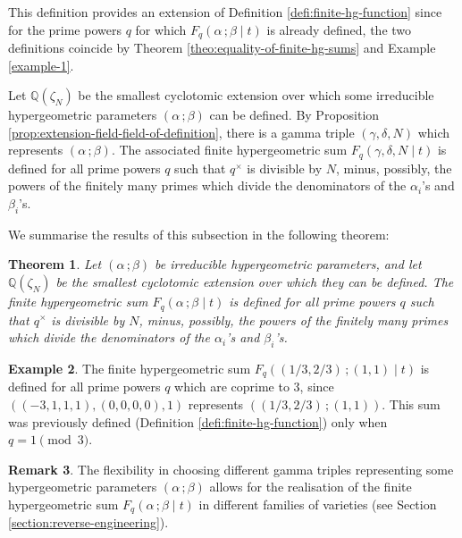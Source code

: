 \documentclass[11pt, reqno]{amsart}
\theoremstyle{plain}
\newtheorem{theo}{Theorem}[section]
\theoremstyle{definition}
\newtheorem{rem}[theo]{Remark}
\newtheorem{exa}[theo]{Example}
\newcommand{\Q}{\mathbb{Q}}
\newcommand{\ga}{\gamma}
\newcommand{\be}{\beta}
\newcommand{\al}{\alpha}
\begin{document}
This definition provides an extension of Definition \ref{defi:finite-hg-function} since for the prime powers $q$ for which $F_q(\al \, ; \be \mid t)$ is already defined, the two definitions coincide by Theorem \ref{theo:equality-of-finite-hg-sums} and Example \ref{example-1}.

Let $\Q(\zeta_N)$ be the smallest cyclotomic extension over which some irreducible hypergeometric parameters $(\al \,; \be)$ can be defined. By Proposition \ref{prop:extension-field-field-of-definition}, there is a gamma triple $(\ga,\delta,N)$ which represents $(\al \, ; \be)$. 
The associated finite hypergeometric sum $F_q(\ga,\delta,N \mid t)$ is defined for all prime powers $q$ such that $q^\times$ is divisible by $N$, minus, possibly, the powers of the finitely many primes which divide the denominators of the $\al_i$'s and $\beta_i$'s.

We summarise the results of this subsection in the following theorem:

\begin{theo}\label{theo:extension-of-finite-hg-function}
Let  $(\al \,; \be)$ be irreducible hypergeometric parameters, and let $\Q(\zeta_N)$ be the smallest cyclotomic extension over which they can be defined.
The finite hypergeometric sum $F_q(\al \,; \be \mid t)$ is defined for all prime powers $q$ such that $q^\times$ is divisible by $N$, minus, possibly, the powers of the finitely many primes which divide the denominators of the $\al_i$'s and $\beta_i$'s.
\end{theo}

\begin{exa}\label{example-extension-of-primes}
The finite hypergeometric sum $F_q((1/3,2/3) \, ; (1,1) \mid t)$ is defined for all prime powers $q$ which are coprime to $3$, since $((-3,1,1,1),(0,0,0,0),1)$ represents $((1/3,2/3)\, ; (1,1))$. This sum was previously defined (Definition \ref{defi:finite-hg-function}) only when $q=1 \pmod{3}$. 
\end{exa}

\begin{rem}
The flexibility in choosing different gamma triples representing some hypergeometric parameters $(\al \, ; \be)$ allows for the realisation of the finite hypergeometric sum $F_q(\al \, ; \be \mid t)$ in different families of varieties (see Section \ref{section:reverse-engineering}).
\end{rem}
\end{document}

